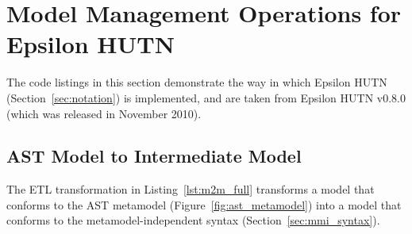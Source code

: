 
\section[Model Management Operations for Epsilon HUTN][Model Management Operations for HUTN]{Model Management Operations for Epsilon HUTN}
\label{sec:hutn_listings}
The code listings in this section demonstrate the way in which Epsilon HUTN (Section~\ref{sec:notation}) is implemented, and are taken from Epsilon HUTN v0.8.0 (which was released in November 2010).

\subsection{AST Model to Intermediate Model}
The ETL transformation in Listing~\ref{lst:m2m_full} transforms a model that conforms to the AST metamodel (Figure~\ref{fig:ast_metamodel}) into a model that conforms to the metamodel-independent syntax (Section~\ref{sec:mmi_syntax}).

